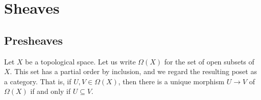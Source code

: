 
\section{Sheaves}%
\label{sec:sheaves}

\subsection{Presheaves}%
\label{sub:presheaves}

\begin{notation}
	Let $ X $ be a topological space.
	Let us write $ \Omega(X) $ for the set of open subsets of $ X $.
	This set has a partial order by inclusion, and
	we regard the resulting poset as a category.
	That is, if $ U, V \in \Omega(X) $, then
	there is a unique morphism $ U \to V $ of $ \Omega(X) $
	if and only if $ U \subseteq V $.
\end{notation}


